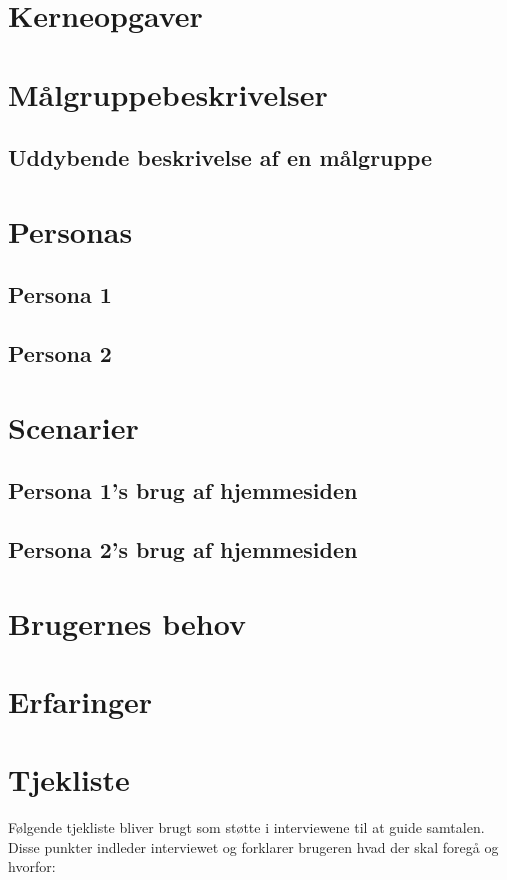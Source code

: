 \documentclass[a4paper,12pt]{article}
\begin{document}
\section{Kerneopgaver}

\section{Målgruppebeskrivelser}
\subsection{Uddybende beskrivelse af en målgruppe}

\section{Personas}
\subsection{Persona 1}
\subsection{Persona 2}

\section{Scenarier}
\subsection{Persona 1's brug af hjemmesiden}
\subsection{Persona 2's brug af hjemmesiden}

\section{Brugernes behov}

\section{Erfaringer}

\newpage 
\appendix
\section{Tjekliste}
Følgende tjekliste bliver brugt som støtte i interviewene til at guide samtalen. \\
Disse punkter indleder interviewet og forklarer brugeren hvad der skal foregå og hvorfor:
\end{document}
